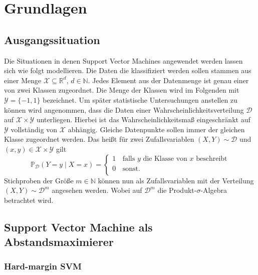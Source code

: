 \documentclass{article}
\theoremstyle{plain}
\theoremstyle{definition}
\newtheorem{dfn}[thm]{Definition}
\begin{document}
    
\newpage

\section{Grundlagen}
\subsection{Ausgangssituation}
    Die Situationen in denen Support Vector Machines angewendet werden lassen sich wie folgt modellieren. Die Daten die klassifiziert werden sollen stammen aus einer Menge $\mathcal{X} \subseteq \mathbb{R}^{d}$, $d \in \mathbb{N}$. Jedes Element aus der Datenmenge ist genau einer von zwei Klassen zugeordnet. Die Menge der Klassen wird im Folgenden mit $\mathcal{Y} = \{-1, 1\}$ bezeichnet. Um später statistische Untersuchungen anstellen zu können wird angenommen, dass die Daten einer Wahrscheinlichkeitsverteilung $\mathcal{D}$ auf $\mathcal{X} \times \mathcal{Y}$ unterliegen. Hierbei ist das Wahrscheinlichkeitsmaß eingeschränkt auf $\mathcal{Y}$ vollständig von $\mathcal{X}$ abhängig. Gleiche Datenpunkte sollen immer der gleichen Klasse zugeordnet werden. Das heißt für zwei Zufallsvariablen $(X,Y) \sim \mathcal{D}$ und $(x,y) \in \mathcal{X} \times \mathcal{Y}$ gilt
    \[
        \mathbb{P}_{\mathcal{D}}(Y = y \mid X = x) =  \left\{
            \begin{array}{ll}
                 1 & \, \textrm{falls $y$ die Klasse von $x$ beschreibt}   \\
                 0 & \, \textrm{sonst.} \\ 
            \end{array}
            \right.
    \]
    Stichproben der Größe $m \in \mathbb{N}$ können nun als Zufallsvariablen mit der Verteilung $(X,Y) \sim \mathcal{D}^{m}$ angesehen werden. Wobei auf $\mathcal{D}^{m}$ die Produkt-$\sigma$-Algebra betrachtet wird.
    
    

\subsection{Support Vector Machine als Abstandsmaximierer}\label{chapter_abstand}

\subsubsection{Hard-margin SVM}
    
\end{document}
